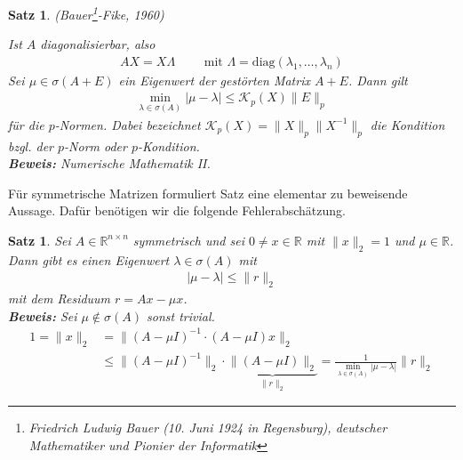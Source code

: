 \documentclass[%
a4paper,
11pt,		%
]
{scrartcl}
\theoremstyle{plain}
\theoremstyle{plain}
\newtheorem{mysatz}[mydef]{Satz}
\theoremstyle{plain}
\theoremstyle{plain}
\begin{document}
\begin{mysatz} (Bauer\footnote{Friedrich Ludwig Bauer (10. Juni 1924 in Regensburg), deutscher Mathematiker und Pionier der Informatik}-Fike, 1960)

Ist $A$ diagonalisierbar, also
\begin{align*}
AX = X\Lambda \qquad \text{ mit } \Lambda = \text{diag}(\lambda_1,\dots,\lambda_n)
\end{align*}
Sei $\mu \in \sigma(A+E)$ ein Eigenwert der gestörten Matrix $A+E$. Dann gilt
\begin{align*}
\min\limits_{\lambda \in \sigma(A)} |\mu - \lambda| \leq \mathcal{K}_p(X) \|E\|_p
\end{align*}
für die $p$-Normen. Dabei bezeichnet $\mathcal{K}_p(X) = \|X\|_p \|X^{-1}\|_p$ die Kondition bzgl. der $p$-Norm oder $p$-Kondition.\\

\textbf{Beweis:} Numerische Mathematik II.
\end{mysatz}

Für symmetrische Matrizen formuliert Satz  eine elementar zu beweisende Aussage. Dafür benötigen wir die folgende Fehlerabschätzung.

\begin{mysatz}\label{satz:ewresiduum}
Sei $A \in \mathbb{R}^{n \times n}$ symmetrisch und sei $0 \neq x \in \mathbb{R}$ mit $\|x\|_2 = 1$ und $\mu \in \mathbb{R}$. Dann gibt es einen Eigenwert 
$\lambda \in \sigma(A)$ mit
\begin{align*}
|\mu - \lambda| \leq \|r\|_2
\end{align*}
mit dem Residuum $r = Ax - \mu x$.\\

\textbf{Beweis:} Sei $\mu \notin \sigma(A)$ sonst trivial.
\begin{align*}
1 = \|x\|_2 & = \|(A -\mu I)^{-1} \cdot  (A - \mu I)x \|_2 \\
& \leq \|(A - \mu I)^{-1}\|_2 \cdot  \underbrace{\|(A - \mu I)\|_2}_{\|r\|_2} = \frac{1}{\min\limits_{\lambda \in \sigma(A)} |\mu - \lambda|} \|r\|_2
\end{align*}
\end{mysatz}
\end{document}
